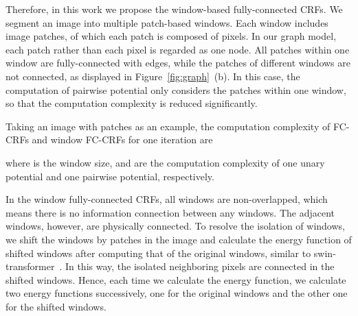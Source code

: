 \documentclass[10pt,twocolumn,letterpaper]{article}
\begin{document}
Therefore, in this work we propose the window-based fully-connected CRFs. We segment an image into multiple patch-based windows. Each window includes  image patches, of which each patch is composed of  pixels.
In our graph model, each patch rather than each pixel is regarded as one node.
All patches within one window are fully-connected with edges, while the patches of different windows are not connected, as displayed in Figure~\ref{fig:graph}~(b). In this case, the computation of pairwise potential only considers the patches within one window, so that the computation complexity is reduced significantly.

Taking an image with  patches as an example, the computation complexity of FC-CRFs and window FC-CRFs for one iteration are

where  is the window size,  and  are the computation complexity of one unary potential and one pairwise potential, respectively.

In the window fully-connected CRFs, all windows are non-overlapped, which means there is no information connection between any windows. The adjacent windows, however, are physically connected. To resolve the isolation of windows, we shift the windows by  patches in the image and calculate the energy function of shifted windows after computing that of the original windows, similar to swin-transformer~\cite{liu2021swin}. 
In this way, the isolated neighboring pixels are connected in the shifted windows.
Hence, each time we calculate the energy function, we calculate two energy functions successively, one for the original windows and the other one for the shifted windows. 
\end{document}
